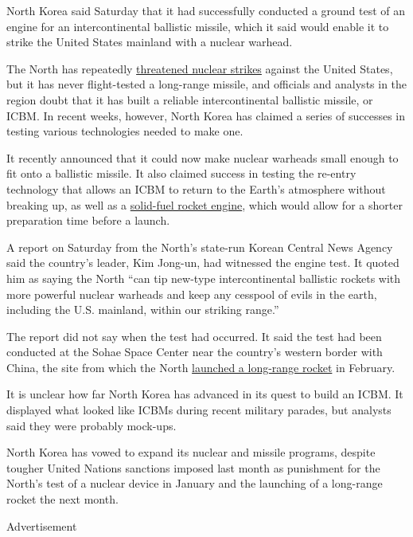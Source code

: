 North Korea said Saturday that it had successfully conducted a ground
test of an engine for an intercontinental ballistic missile, which it
said would enable it to strike the United States mainland with a nuclear
warhead.

The North has repeatedly
\href{http://www.nytimes.com/2016/03/27/world/asia/north-korea-propaganda-video-nuclear-strike.html}{threatened
nuclear strikes} against the United States, but it has never
flight-tested a long-range missile, and officials and analysts in the
region doubt that it has built a reliable intercontinental ballistic
missile, or ICBM. In recent weeks, however, North Korea has claimed a
series of successes in testing various technologies needed to make one.

It recently announced that it could now make nuclear warheads small
enough to fit onto a ballistic missile. It also claimed success in
testing the re-entry technology that allows an ICBM to return to the
Earth's atmosphere without breaking up, as well as a
\href{http://www.nytimes.com/2016/03/25/world/asia/north-korea-solid-fuel-rocket-engine.html}{solid-fuel
rocket engine}, which would allow for a shorter preparation time before
a launch.

A report on Saturday from the North's state-run Korean Central News
Agency said the country's leader, Kim Jong-un, had witnessed the engine
test. It quoted him as saying the North ``can tip new-type
intercontinental ballistic rockets with more powerful nuclear warheads
and keep any cesspool of evils in the earth, including the U.S.
mainland, within our striking range.''

The report did not say when the test had occurred. It said the test had
been conducted at the Sohae Space Center near the country's western
border with China, the site from which the North
\href{http://www.nytimes.com/2016/02/07/world/asia/north-korea-moves-up-rocket-launching-plan.html}{launched
a long-range rocket} in February.

It is unclear how far North Korea has advanced in its quest to build an
ICBM. It displayed what looked like ICBMs during recent military
parades, but analysts said they were probably mock-ups.

North Korea has vowed to expand its nuclear and missile programs,
despite tougher United Nations sanctions imposed last month as
punishment for the North's test of a nuclear device in January and the
launching of a long-range rocket the next month.

Advertisement

